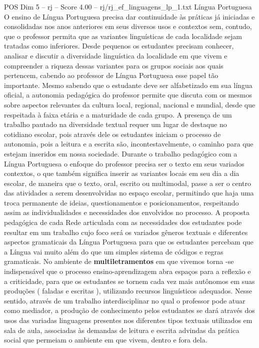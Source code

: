 \begin{textsample}{POS Dim 5 – rj – Score 4.00 – rj/rj\_ef\_linguagens\_lp\_1.txt}  \label{ex:f5_pos_192}
Língua Portuguesa O ensino de Língua Portuguesa precisa dar continuidade às práticas já iniciadas e consolidadas nos anos anteriores em seus diversos usos e contextos sem, contudo, que o professor permita que as variantes linguísticas de cada localidade sejam tratadas como inferiores.
Desde pequenos os estudantes precisam conhecer, analisar e discutir a diversidade linguística da localidade em que vivem e compreender a riqueza dessas variantes para os grupos sociais aos quais pertencem, cabendo ao professor de Língua Portuguesa esse papel tão importante.
Mesmo sabendo que o estudante deve ser alfabetizado em sua língua oficial, a autonomia pedagógica do professor permite que discuta com os mesmos sobre aspectos relevantes da cultura local, regional, nacional e mundial, desde que respeitada à faixa etária e a maturidade de cada grupo.
A presença de um trabalho pautado na diversidade textual requer um lugar de destaque no cotidiano escolar, pois através dele os estudantes iniciam o processo de autonomia, pois a leitura e a escrita são, incontestavelmente, o caminho para que estejam inseridos em nossa sociedade.
Durante o trabalho pedagógico com a Língua Portuguesa o enfoque do professor precisa ser o texto em seus variados contextos, o que também significa inserir as variantes locais em seu dia a dia escolar, de maneira que o texto, oral, escrito ou multimodal, passe a ser o centro das atividades a serem desenvolvidas no espaço escolar, permitindo que haja uma troca permanente de ideias, questionamentos e posicionamentos, respeitando assim as individualidades e necessidades dos envolvidos no processo.
A proposta pedagógica de cada Rede articulada com as necessidades dos estudantes pode resultar em um trabalho cujo foco será os variados gêneros textuais e diferentes aspectos gramaticais da Língua Portuguesa para que os estudantes percebam que a Língua vai muito além do que um simples sistema de códigos e regras gramaticais.
No ambiente de \textbf{multiletramentos} em que vivemos torna -se indispensável que o processo ensino-aprendizagem abra espaços para a reflexão e a criticidade, para que os estudantes se tornem cada vez mais autônomos em suas produções ( faladas e escritas ), utilizando recursos linguísticos adequados.
Nesse sentido, através de um trabalho interdisciplinar no qual o professor pode atuar como mediador, a produção de conhecimento pelos estudantes se dará através dos usos das variadas linguagens presentes nos diferentes tipos textuais utilizados em sala de aula, associadas às demandas de leitura e escrita advindas da prática social que permeiam o ambiente em que vivem, dentro e fora dela.

\end{textsample}
